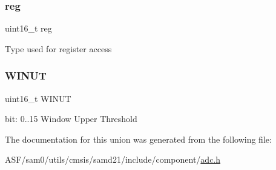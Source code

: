\subsubsection{\texorpdfstring{reg}{reg}}
{\footnotesize\ttfamily uint16\+\_\+t reg}

Type used for register access \mbox{\label{union_a_d_c___w_i_n_u_t___type_a00364f26fde23e6a2331183c1aa8f876}} 
\subsubsection{\texorpdfstring{WINUT}{WINUT}}
{\footnotesize\ttfamily uint16\+\_\+t W\+I\+N\+UT}

bit\+: 0..15 Window Upper Threshold 

The documentation for this union was generated from the following file\+:\begin{DoxyCompactItemize}
\item 
A\+S\+F/sam0/utils/cmsis/samd21/include/component/\mbox{\hyperlink{component_2adc_8h}{adc.\+h}}\end{DoxyCompactItemize}
